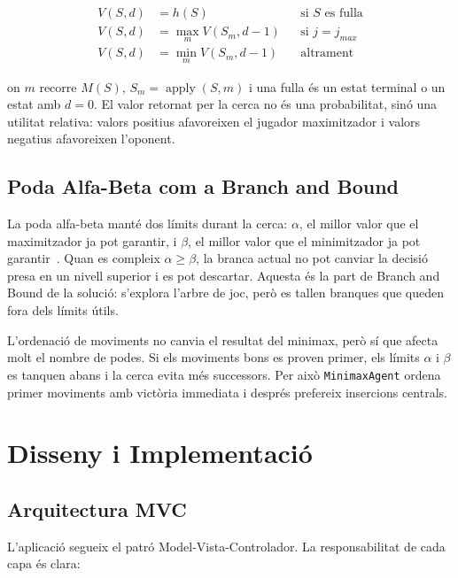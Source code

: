 \documentclass[conference,compsoc]{IEEEtran}
\begin{document}
\begin{equation}
\begin{aligned}
V(S,d)&=h(S) && \text{si } S \text{ es fulla}\\
V(S,d)&=\max_m V(S_m,d-1) && \text{si } j=j_{max}\\
V(S,d)&=\min_m V(S_m,d-1) && \text{altrament}
\end{aligned}
\end{equation}

on $m$ recorre $M(S)$, $S_m=\operatorname{apply}(S,m)$ i una fulla és un estat
terminal o un estat amb $d=0$. El valor retornat per la cerca no és una
probabilitat, sinó una utilitat relativa: valors positius afavoreixen el jugador
maximitzador i valors negatius afavoreixen l'oponent.

\subsection{Poda Alfa-Beta com a Branch and Bound}

La poda alfa-beta manté dos límits durant la cerca: $\alpha$, el millor valor que
el maximitzador ja pot garantir, i $\beta$, el millor valor que el minimitzador ja
pot garantir~\cite{ref_gfg_alphabeta}. Quan es compleix $\alpha \geq \beta$, la branca actual no pot canviar
la decisió presa en un nivell superior i es pot descartar. Aquesta és la part de
Branch and Bound de la solució: s'explora l'arbre de joc, però es tallen branques
que queden fora dels límits útils.

L'ordenació de moviments no canvia el resultat del minimax, però sí que afecta
molt el nombre de podes. Si els moviments bons es proven primer, els límits
$\alpha$ i $\beta$ es tanquen abans i la cerca evita més successors. Per això
\texttt{MinimaxAgent} ordena primer moviments amb victòria immediata i després
prefereix insercions centrals.


\section{Disseny i Implementació}

\subsection{Arquitectura MVC}

L'aplicació segueix el patró Model-Vista-Controlador.
La responsabilitat de cada capa és clara:
\end{document}
